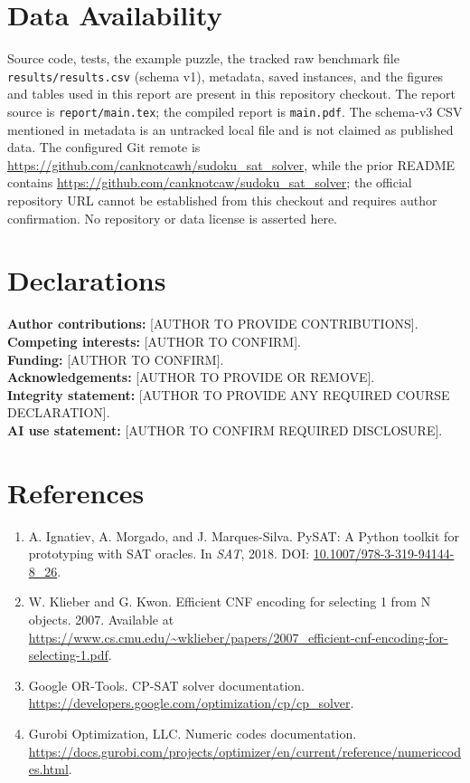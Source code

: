 \IfFileExists{cas-sc.cls}{\documentclass[a4paper,fleqn]{cas-sc}}{\documentclass[a4paper,11pt]{article}}
\begin{document}
\section*{Data Availability}
Source code, tests, the example puzzle, the tracked raw benchmark file \texttt{results/results.csv} (schema v1), metadata, saved instances, and the figures and tables used in this report are present in this repository checkout. The report source is \texttt{report/main.tex}; the compiled report is \texttt{main.pdf}. The schema-v3 CSV mentioned in metadata is an untracked local file and is not claimed as published data. The configured Git remote is \url{https://github.com/canknotcawh/sudoku_sat_solver}, while the prior README contains \url{https://github.com/canknotcaw/sudoku_sat_solver}; the official repository URL cannot be established from this checkout and requires author confirmation. No repository or data license is asserted here.

\section*{Declarations}
\textbf{Author contributions:} [AUTHOR TO PROVIDE CONTRIBUTIONS].\\
\textbf{Competing interests:} [AUTHOR TO CONFIRM].\\
\textbf{Funding:} [AUTHOR TO CONFIRM].\\
\textbf{Acknowledgements:} [AUTHOR TO PROVIDE OR REMOVE].\\
\textbf{Integrity statement:} [AUTHOR TO PROVIDE ANY REQUIRED COURSE DECLARATION].\\
\textbf{AI use statement:} [AUTHOR TO CONFIRM REQUIRED DISCLOSURE].

\section*{References}
\begin{enumerate}[leftmargin=*]
\item A. Ignatiev, A. Morgado, and J. Marques-Silva. PySAT: A Python toolkit for prototyping with SAT oracles. In \emph{SAT}, 2018. DOI: \href{https://doi.org/10.1007/978-3-319-94144-8_26}{10.1007/978-3-319-94144-8\_26}.
\item W. Klieber and G. Kwon. Efficient CNF encoding for selecting 1 from N objects. 2007. Available at \url{https://www.cs.cmu.edu/~wklieber/papers/2007_efficient-cnf-encoding-for-selecting-1.pdf}.
\item Google OR-Tools. CP-SAT solver documentation. \url{https://developers.google.com/optimization/cp/cp_solver}.
\item Gurobi Optimization, LLC. Numeric codes documentation. \url{https://docs.gurobi.com/projects/optimizer/en/current/reference/numericcodes.html}.
\end{enumerate}
\end{document}
